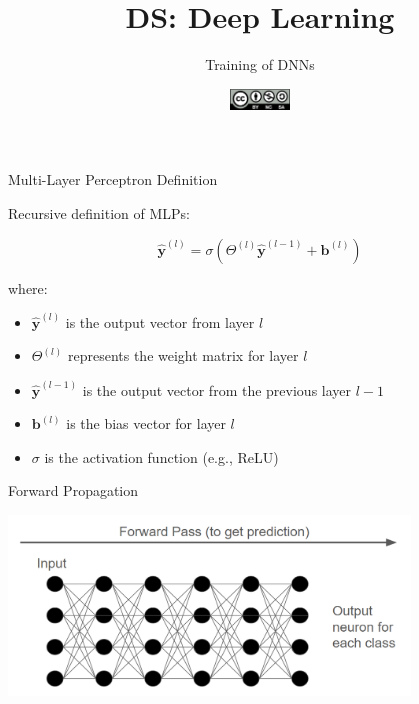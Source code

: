 \documentclass[aspectratio=169]{../latex_main/tntbeamer}  %
\title[DL: Training of DNNs]{DS: Deep Learning}
\subtitle{Training of DNNs}
\date{\hspace{0.5em} {\includegraphics[height=1.5em]{../latex_main/figures/Cc-by-nc-sa_icon.svg.png}}}
\begin{document}
	
	\maketitle
	\begin{frame}{Multi-Layer Perceptron Definition}

        Recursive definition of MLPs:

            \[
            \hat{\textbf{y}}^{(l)} = \sigma({\Theta}^{(l)} \hat{\textbf{y}}^{(l-1)} + \textbf{b}^{(l)})
            \]
            
            where:
            \begin{itemize}
                \item \( \hat{\textbf{y}}^{(l)} \) is the output vector from layer \( l \)
                \item \( \Theta^{(l)} \) represents the weight matrix for layer \( l \)
                \item \( \hat{\textbf{y}}^{(l-1)} \) is the output vector from the previous layer \( l-1 \)
                \item \( \textbf{b}^{(l)} \) is the bias vector for layer \( l \)
                \item \( \sigma \) is the activation function (e.g., ReLU)
            \end{itemize}
                
	\end{frame}


  	\begin{frame}{Forward Propagation}

        \includegraphics[width=0.8\textwidth]{figures/forward.png}

        \end{frame}
\end{document}
